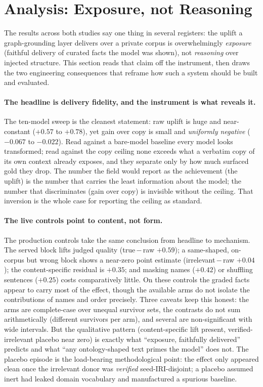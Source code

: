 \documentclass[10pt,twocolumn]{article}
\begin{document}
\section{Analysis: Exposure, not Reasoning}\label{sec:analysis}
The results across both studies say one thing in several registers: the uplift a graph-grounding layer
delivers over a private corpus is overwhelmingly \emph{exposure} (faithful delivery of curated facts
the model was shown), not \emph{reasoning} over injected structure. This section reads that claim
off the instrument, then draws the two engineering consequences that reframe how such a system should
be built and evaluated.

\paragraph{The headline is delivery fidelity, and the instrument is what reveals it.} The ten-model
sweep is the cleanest statement: raw uplift is huge and near-constant ($+0.57$ to $+0.78$), yet gain
over copy is small and \emph{uniformly negative} ($-0.067$ to $-0.022$). Read against a bare-model
baseline every model looks transformed; read against the copy ceiling none exceeds what a verbatim
copy of its own context already exposes, and they separate only by how much surfaced gold they drop.
The number the field would report as the achievement (the uplift) is the number that carries the least
information about the model; the number that discriminates (gain over copy) is invisible without the
ceiling. That inversion is the whole case for reporting the ceiling as standard.

\paragraph{The live controls point to content, not form.} The production controls take the
same conclusion from headline to mechanism. The served block lifts judged quality (true\,$-$\,raw
$+0.59$); a same-shaped, on-corpus but wrong block shows a near-zero point estimate
(irrelevant\,$-$\,raw $+0.04$); the content-specific residual is $+0.35$; and masking names ($+0.42$)
or shuffling sentences ($+0.25$) costs comparatively little. On these controls the graded facts appear
to carry most of the effect, though the available arms do not isolate the contributions of names and
order precisely. Three
caveats keep this honest: the arms are complete-case over unequal survivor sets, the contrasts do not
sum arithmetically (different survivors per arm), and several are non-significant with wide intervals.
But the qualitative pattern (content-specific lift present, verified-irrelevant placebo near zero) is exactly
what ``exposure, faithfully delivered'' predicts and what ``any ontology-shaped text primes the model''
does not. The placebo episode is the load-bearing methodological point: the effect only appeared clean
once the irrelevant donor was \emph{verified} seed-IRI-disjoint; a placebo assumed inert had leaked
domain vocabulary and manufactured a spurious baseline.
\end{document}
